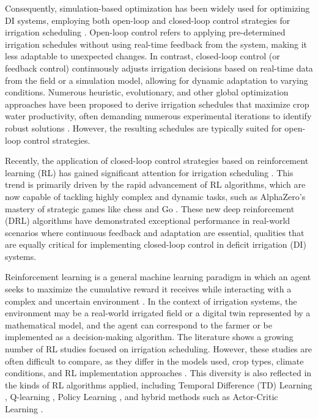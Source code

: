 \documentclass{scrartcl}
\begin{document}
Consequently, simulation-based optimization has been widely used for optimizing DI systems, employing both open-loop and closed-loop control strategies for irrigation scheduling \citep{Schuetze2010}. Open-loop control refers to applying pre-determined irrigation schedules without using real-time feedback from the system, making it less adaptable to unexpected changes. In contrast, closed-loop control (or feedback control) continuously adjusts irrigation decisions based on real-time data from the field or a simulation model, allowing for dynamic adaptation to varying conditions. Numerous heuristic, evolutionary, and other global optimization approaches have been proposed to derive irrigation schedules that maximize crop water productivity, often demanding numerous experimental iterations to identify robust solutions \citep{Dantas2025}. However, the resulting schedules are typically suited for open-loop control strategies.

Recently, the application of closed-loop control strategies based on reinforcement learning (RL) has gained significant attention for irrigation scheduling \citep{Wang2021,Abioye2022,Bwambale2023, Umutoni2024, Ajith2025}. This trend is primarily driven by the rapid advancement of RL algorithms, which are now capable of tackling highly complex and dynamic tasks, such as AlphaZero’s mastery of strategic games like chess and Go \citep{Silver2018}. These new deep reinforcement (DRL) algorithms have demonstrated exceptional performance in real-world scenarios where continuous feedback and adaptation are essential, qualities that are equally critical for implementing closed-loop control in deficit irrigation (DI) systems.

Reinforcement learning is a general machine learning paradigm in which an agent seeks to maximize the cumulative reward it receives while interacting with a complex and uncertain environment \citep{Sutton1998}. In the context of irrigation systems, the environment may be a real-world irrigated field or a digital twin represented by a mathematical model, and the agent can correspond to the farmer or be implemented as a decision-making algorithm. The literature shows a growing number of RL studies focused on irrigation scheduling. However, these studies are often difficult to compare, as they differ in the models used, crop types, climate conditions, and RL implementation approaches \citep{Saikai2023}. This diversity is also reflected in the kinds of RL algorithms applied, including Temporal Difference (TD) Learning \citep{Schuetze2011}, Q-learning \citep{Yang2020,Chen2021,Alibabaei2022,Song2022,Devarajan2023,Ramli2024,QueirozPereira2025}, Policy Learning \citep{Alibabaei2022a,Ding2022,Saikai2023,Kelly2024,Agyeman2025,Abid2025}, and hybrid methods such as Actor-Critic Learning \citep{Alibabaei2022a,Heidari2025}.
\end{document}
